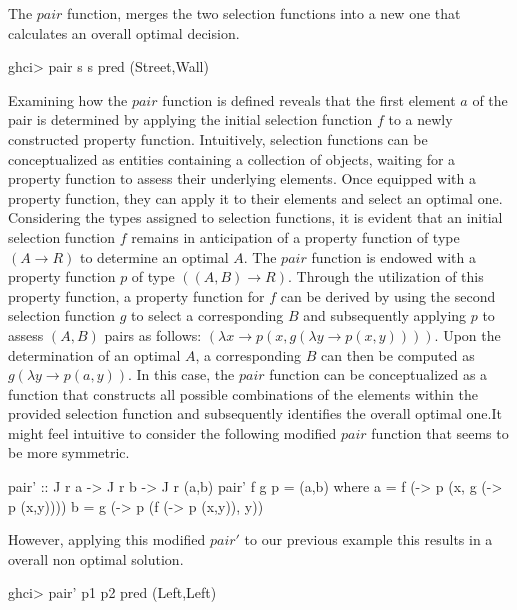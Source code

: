 \documentclass[runningheads]{llncs}
\begin{document}
The \(pair\) function, merges the two selection functions into a new one
that calculates an overall optimal decision.

\begin{haskell}
ghci> pair s s pred
(Street,Wall)
\end{haskell}

Examining how the \(pair\) function is defined reveals that the first
element \(a\) of the pair is determined by applying the initial
selection function \(f\) to a newly constructed property function.
Intuitively, selection functions can be conceptualized as entities
containing a collection of objects, waiting for a property function to
assess their underlying elements. Once equipped with a property
function, they can apply it to their elements and select an optimal one.
Considering the types assigned to selection functions, it is evident
that an initial selection function \(f\) remains in anticipation of a
property function of type \((A \rightarrow R)\) to determine an optimal
\(A\). The \(pair\) function is endowed with a property function \(p\)
of type \(((A,B) \rightarrow R)\). Through the utilization of this
property function, a property function for \(f\) can be derived by using
the second selection function \(g\) to select a corresponding \(B\) and
subsequently applying \(p\) to assess \((A,B)\) pairs as follows:
\((\lambda x \rightarrow p (x, g (\lambda y \rightarrow p (x,y))))\).
Upon the determination of an optimal \(A\), a corresponding \(B\) can
then be computed as \(g (\lambda y \rightarrow p (a,y))\). In this case,
the \(pair\) function can be conceptualized as a function that
constructs all possible combinations of the elements within the provided
selection function and subsequently identifies the overall optimal
one.It might feel intuitive to consider the following modified \(pair\)
function that seems to be more symmetric.

\begin{code}
pair' :: J r a -> J r b -> J r (a,b)
pair' f g p = (a,b)
  where
      a = f (\x -> p (x, g (\y -> p (x,y))))
      b = g (\y -> p (f (\x -> p (x,y)), y))
\end{code}

However, applying this modified \(pair'\) to our previous example this
results in a overall non optimal solution.

\begin{haskell}
ghci> pair' p1 p2 pred
(Left,Left)
\end{haskell}
\end{document}
